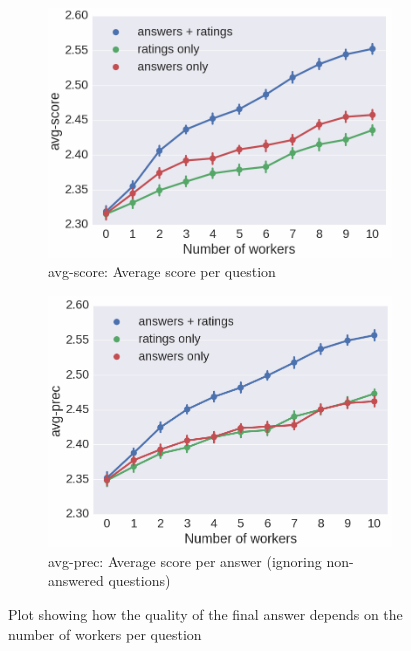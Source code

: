 \begin{figure}
  \begin{subfigure}[t]{0.5\textwidth}
    \centering
    \includegraphics[width=\textwidth]{img/crqa_nworkers_vs_accuracy}
    \caption{avg-score: Average score per question}
    \label{figure:crqa:nworkers_vs_accuracy}
  \end{subfigure}
  \begin{subfigure}[t]{0.5\textwidth}
    \centering
    \includegraphics[width=\textwidth]{img/crqa_nworkers_vs_precision}
    \caption{avg-prec: Average score per answer (ignoring non-answered questions)}
    \label{figure:crqa:nworkers_vs_precision}
  \end{subfigure}
    \caption{Plot showing how the quality of the final answer depends on the number of workers per question}
    \label{figure:non-factoid:crowdsourcing:crqa:nworkers_vs_quality}
\end{figure}

